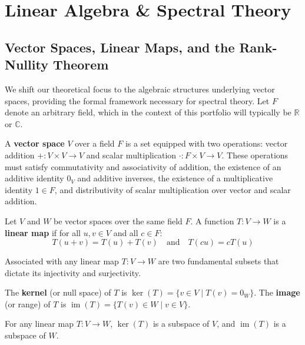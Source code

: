 \section{Linear Algebra \& Spectral Theory}

\subsection{Vector Spaces, Linear Maps, and the Rank-Nullity Theorem}

We shift our theoretical focus to the algebraic structures underlying vector spaces, providing the formal framework necessary for spectral theory. Let $F$ denote an arbitrary field, which in the context of this portfolio will typically be $\mathbb{R}$ or $\mathbb{C}$.

\begin{definition}
A \textbf{vector space} $V$ over a field $F$ is a set equipped with two operations: vector addition $+ : V \times V \to V$ and scalar multiplication $\cdot : F \times V \to V$. These operations must satisfy commutativity and associativity of addition, the existence of an additive identity $0_V$ and additive inverses, the existence of a multiplicative identity $1 \in F$, and distributivity of scalar multiplication over vector and scalar addition.
\end{definition}

\begin{definition}
Let $V$ and $W$ be vector spaces over the same field $F$. A function $T: V \to W$ is a \textbf{linear map} if for all $u, v \in V$ and all $c \in F$:
\[
T(u + v) = T(u) + T(v) \quad \text{and} \quad T(cu) = cT(u)
\]
\end{definition}

Associated with any linear map $T: V \to W$ are two fundamental subsets that dictate its injectivity and surjectivity.

\begin{definition}
The \textbf{kernel} (or null space) of $T$ is $\ker(T) = \{ v \in V \mid T(v) = 0_W \}$. The \textbf{image} (or range) of $T$ is $\operatorname{im}(T) = \{ T(v) \in W \mid v \in V \}$.
\end{definition}

\begin{lemma}
For any linear map $T: V \to W$, $\ker(T)$ is a subspace of $V$, and $\operatorname{im}(T)$ is a subspace of $W$.
\end{lemma}

